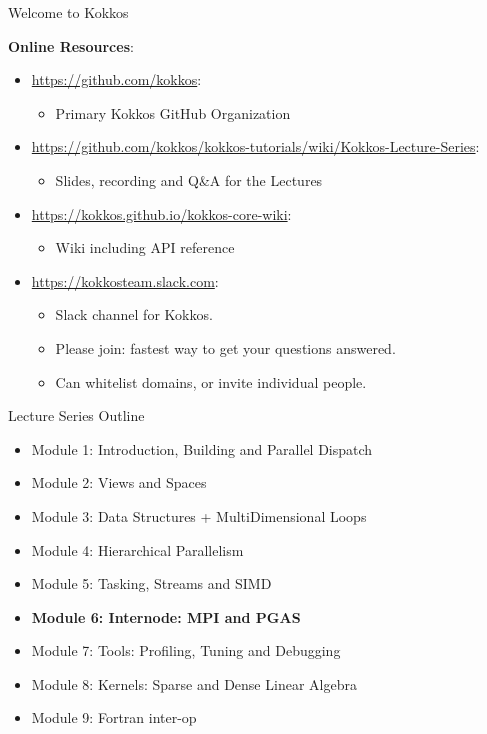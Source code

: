 \begin{frame}[fragile]{Welcome to Kokkos}

\textbf{Online Resources}:

\begin{itemize}
        \item \url{https://github.com/kokkos}:
                \begin{itemize}
                        \item Primary Kokkos GitHub Organization
                \end{itemize}
        \item \url{https://github.com/kokkos/kokkos-tutorials/wiki/Kokkos-Lecture-Series}:
                \begin{itemize}
        \item{Slides, recording and Q\&A for the Lectures}
                \end{itemize}
        \item \url{https://kokkos.github.io/kokkos-core-wiki}:
                \begin{itemize}
                        \item Wiki including API reference
                \end{itemize}
        \item \url{https://kokkosteam.slack.com}:
                \begin{itemize}
                        \item Slack channel for Kokkos.
                        \item Please join: fastest way to get your questions answered.
                        \item Can whitelist domains, or invite individual people.
                \end{itemize}
\end{itemize}

\end{frame}



\begin{frame}{Lecture Series Outline}

\begin{itemize}
        \item Module 1: Introduction, Building and Parallel Dispatch
        \item Module 2: Views and Spaces
        \item Module 3: Data Structures + MultiDimensional Loops
        \item Module 4: Hierarchical Parallelism
        \item Module 5: Tasking, Streams and SIMD
        \item \textbf{Module 6: Internode: MPI and PGAS}
        \item Module 7: Tools: Profiling, Tuning and Debugging
        \item Module 8: Kernels: Sparse and Dense Linear Algebra
        \item Module 9: Fortran inter-op
\end{itemize}
\end{frame}

